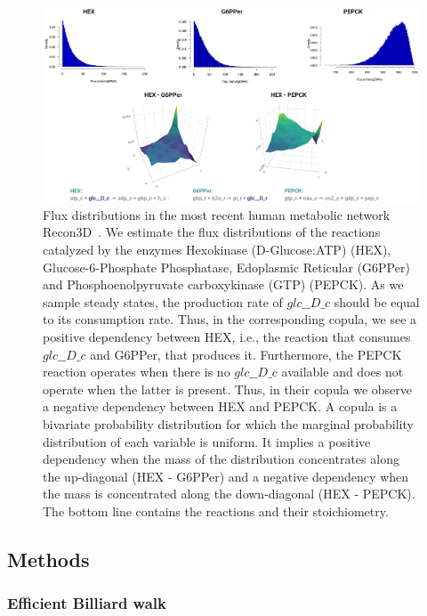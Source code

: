    \begin{figure}[h]
      \centering
      \includegraphics[width=125mm]{figures/copulas_cropped.png}
      \caption{
         Flux distributions in the most recent human metabolic network Recon3D~\cite{brunk2018recon3d}. 
         We estimate the flux distributions of the reactions catalyzed by the enzymes Hexokinase (D-Glucose:ATP) (HEX), Glucose-6-Phosphate Phosphatase, Edoplasmic Reticular (G6PPer)
         and Phosphoenolpyruvate carboxykinase (GTP) (PEPCK).
         As we sample steady states, the production rate of $glc\_\_D \_c$ should be equal to its consumption rate. 
         Thus, in the corresponding copula, we see a positive dependency between HEX,
         i.e., the reaction that consumes $glc\_\_D \_c$ and G6PPer, that produces it.
         Furthermore, the PEPCK reaction operates when there is no $glc\_\_D\_c$ available and does not operate when the latter is present.
         Thus, in their copula we observe a negative dependency between HEX and PEPCK.
         A copula is a bivariate probability distribution for which the marginal probability distribution of each variable is uniform.
         It implies a positive dependency when the mass of the distribution concentrates along the up-diagonal (HEX - G6PPer)
         and a negative dependency when the mass is concentrated along the down-diagonal (HEX - PEPCK). %
         The bottom line contains the  reactions and their stoichiometry.
      }
   \end{figure}




\subsection{Methods}


\subsubsection{Efficient Billiard walk}

